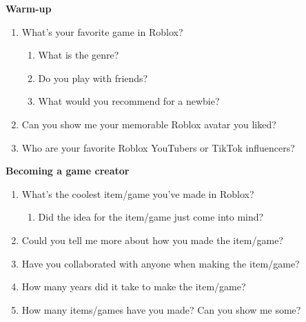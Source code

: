 \begin{appendix}
\noindent\textbf{Warm-up}
\begin{enumerate}[label=\arabic*., topsep=1pt, noitemsep]
    \item What’s your favorite game in Roblox?
    \begin{enumerate}
        \item What is the genre?
        \item Do you play with friends?
        \item What would you recommend for a newbie?
    \end{enumerate}
    \item Can you show me your memorable Roblox avatar you liked?
    \item Who are your favorite Roblox YouTubers or TikTok influencers?
\end{enumerate}

\noindent\textbf{Becoming a game creator}
\begin{enumerate}[label=\arabic*., topsep=1pt, noitemsep]
    \item What’s the coolest item/game you’ve made in Roblox?
    \begin{enumerate}
        \item Did the idea for the item/game just come into mind?
    \end{enumerate}
    \item Could you tell me more about how you made the item/game?
    \item Have you collaborated with anyone when making the item/game?
    \item How many years did it take to make the item/game?
    \item How many items/games have you made? Can you show me some?
\end{enumerate}


\end{appendix}
